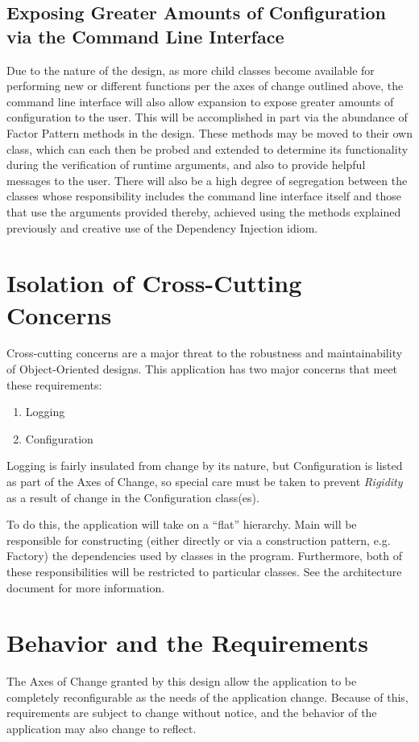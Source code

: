 \documentclass{designdoc}
\begin{document}
\subsection{Exposing Greater Amounts of Configuration via the Command Line
  Interface}
Due to the nature of the design, as more child classes become available for
performing new or different functions per the axes of change outlined above,
the command line interface will also allow expansion to expose greater amounts
of configuration to the user. This will be accomplished in part via the
abundance of Factor Pattern methods in the design. These methods may be moved
to their own class, which can each then be probed and extended to determine its
functionality during the verification of runtime arguments, and also to provide
helpful messages to the user. There will also be a high degree of segregation
between the classes whose responsibility includes the command line interface
itself and those that use the arguments provided thereby, achieved using the
methods explained previously and creative use of the Dependency Injection
idiom.

\section{Isolation of Cross-Cutting Concerns}
Cross-cutting concerns are a major threat to the robustness and maintainability
of Object-Oriented designs. This application has two major concerns that meet
these requirements:
\begin{enumerate}
\item Logging
\item Configuration
\end{enumerate}
Logging is fairly insulated from change by its nature, but Configuration is
listed as part of the Axes of Change, so special care must be taken to prevent
\textit{Rigidity} as a result of change in the Configuration class(es).

To do this, the application will take on a ``flat'' hierarchy. Main will be
responsible for constructing (either directly or via a construction pattern,
e.g. Factory) the dependencies used by classes in the program. Furthermore,
both of these responsibilities will be restricted to particular classes. See
the architecture document for more information.

\section{Behavior and the Requirements}
The Axes of Change granted by this design allow the application to be
completely reconfigurable as the needs of the application change. Because
of this, requirements are subject to change without notice, and the behavior
of the application may also change to reflect.
\end{document}
